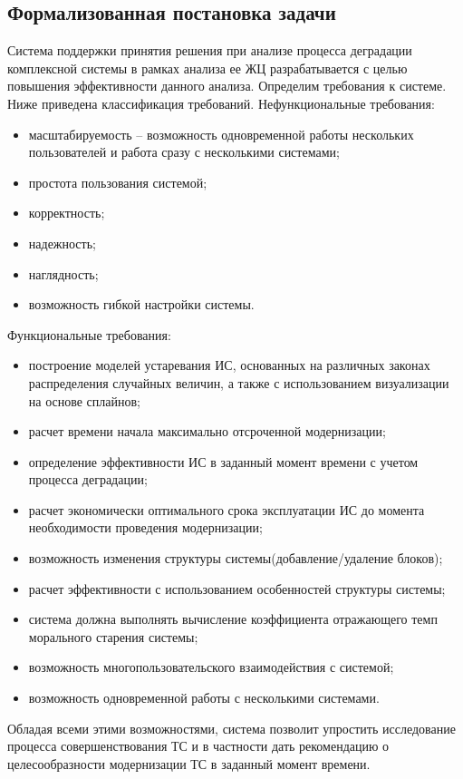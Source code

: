 \subsection{Формализованная постановка задачи}
Система поддержки принятия решения при анализе процесса деградации комплексной системы в рамках анализа ее ЖЦ разрабатывается с целью повышения эффективности данного анализа. 
Определим требования к системе. Ниже приведена классификация требований.
Нефункциональные требования:
\begin{itemize}
    \item масштабируемость – возможность одновременной работы нескольких пользователей и работа сразу с несколькими системами;
    \item простота пользования системой; 
    \item корректность;
    \item надежность;
    \item наглядность;
    \item возможность гибкой настройки системы.
\end{itemize}
Функциональные требования:
\begin{itemize}
    \item построение моделей устаревания ИС, основанных на различных законах распределения случайных величин, а также с использованием визуализации на основе сплайнов;
    \item расчет времени начала максимально отсроченной модернизации;
    \item определение эффективности ИС в заданный момент времени с учетом процесса деградации;
    \item расчет экономически оптимального срока эксплуатации ИС до момента необходимости проведения модернизации;
    \item возможность изменения структуры системы(добавление/удаление блоков);
    \item расчет эффективности с использованием особенностей структуры системы;
    \item система должна выполнять вычисление коэффициента отражающего темп морального старения системы;
    \item возможность многопользовательского взаимодействия с системой;
    \item возможность одновременной работы с несколькими системами.
\end{itemize}

Обладая всеми этими возможностями, система позволит упростить исследование процесса совершенствования ТС и в частности дать рекомендацию о целесообразности модернизации ТС в заданный момент времени.

